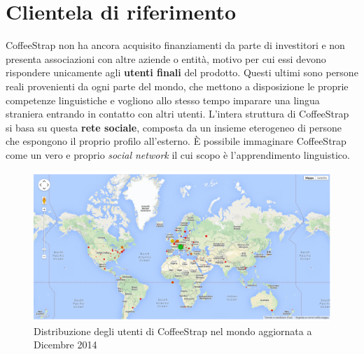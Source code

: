 \section{Clientela di riferimento}

CoffeeStrap non ha ancora acquisito finanziamenti da parte di investitori e non presenta associazioni con altre aziende o entità, motivo per cui essi devono rispondere unicamente agli \textbf{utenti finali} del prodotto. Questi ultimi sono persone reali provenienti da ogni parte del mondo, che mettono a disposizione le proprie competenze linguistiche e vogliono allo stesso tempo imparare una lingua straniera entrando in contatto con altri utenti. L'intera struttura di CoffeeStrap si basa su questa \textbf{rete sociale}, composta da un insieme eterogeneo di persone che espongono il proprio profilo all'esterno. È possibile immaginare CoffeeStrap come un vero e proprio \textit{social network} il cui scopo è l'apprendimento linguistico.

\begin{figure}[htpd]
\centering
\includegraphics[width=\textwidth]{../immagini/user-distribution}
\caption{Distribuzione degli utenti di CoffeeStrap nel mondo aggiornata a Dicembre 2014}
\end{figure}